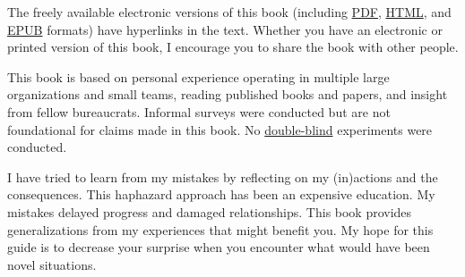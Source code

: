 The freely available electronic versions of this book (including 
\iftoggle{WPinmargin}{\marginpar{$>$Wikipedia: PDF}}{}
\href{https://en.wikipedia.org/wiki/PDF}{PDF}, 
\href{https://en.wikipedia.org/wiki/HTML}{HTML}, and 
\href{https://en.wikipedia.org/wiki/EPUB}{EPUB} 
formats) have hyperlinks in the text. 
\iftoggle{printedonpaper}{}{Light-blue hyperlinks reference external resources like Wikipedia, while dark-blue links reference material within the guide such as the glossary.} Whether you have an electronic or printed version of this book, I encourage you to share the book with other people.


This book is based on personal experience operating in multiple large organizations and small teams, reading published books and papers, and insight from fellow bureaucrats. Informal surveys were conducted but are not foundational for claims made in this book. 
No \href{https://en.wikipedia.org/wiki/Blinded_experiment}{double-blind}%
experiments were conducted. 









I have tried to learn from my mistakes by reflecting on my (in)actions and the consequences. This haphazard approach has been an expensive education. My mistakes delayed progress and damaged relationships. This book provides generalizations from my experiences that might benefit you. My hope for this guide is to decrease your surprise when you encounter what would have been novel situations.



